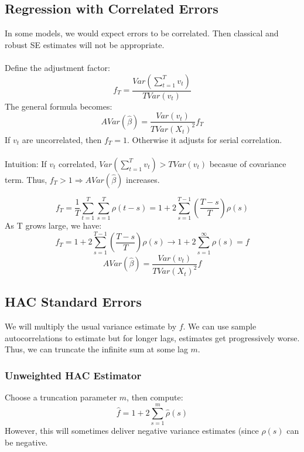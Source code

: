 \documentclass{article}
\begin{document}
\subsection{Regression with Correlated Errors}
In some models, we would expect errors to be correlated. Then classical and robust SE estimates will not be appropriate.\\
\\
Define the adjustment factor:
$$f_T = \frac{Var\left(\sum_{t=1}^T v_t\right)}{TVar(v_t)}$$
The general formula becomes:
$$AVar(\hat{\beta}) = \frac{Var(v_t)}{TVar(X_t)^2}f_T$$
If $v_t$ are uncorrelated, then $f_T = 1$. Otherwise it adjusts for serial correlation.\\
\\
Intuition: If $v_t$ correlated, $Var(\sum_{t=1}^T v_t) > TVar(v_t)$ becasue of covariance term. Thus, $f_T > 1 \Rightarrow AVar(\hat{\beta})$ increases.

$$f_T = \frac{1}{T}\sum_{t=1}^T \sum_{s=1}^T \rho (t-s) = 1 + 2\sum_{s=1}^{T-1} \left(\frac{T-s}{T}\right)\rho (s)$$
As T grows large, we have:
$$f_T = 1 + 2\sum_{s=1}^{T-1} \left(\frac{T-s}{T}\right)\rho (s) \longrightarrow 1 + 2\sum_{s=1}^\infty \rho (s) = f$$
$$AVar(\hat{\beta}) = \frac{Var(v_t)}{TVar(X_t)^2}f$$

\subsection{HAC Standard Errors}
We will multiply the usual variance estimate by $f$. We can use sample autocorrelations to estimate but for longer lags, estimates get progressively worse. Thus, we can truncate the infinite sum at some lag $m$.

\subsubsection{Unweighted HAC Estimator}
Choose a truncation parameter $m$, then compute:
$$\hat{f} = 1 + 2\sum_{s=1}^m \hat{\rho} (s)$$
However, this will sometimes deliver negative variance estimates (since $\hat{\rho}(s)$ can be negative.
\end{document}
